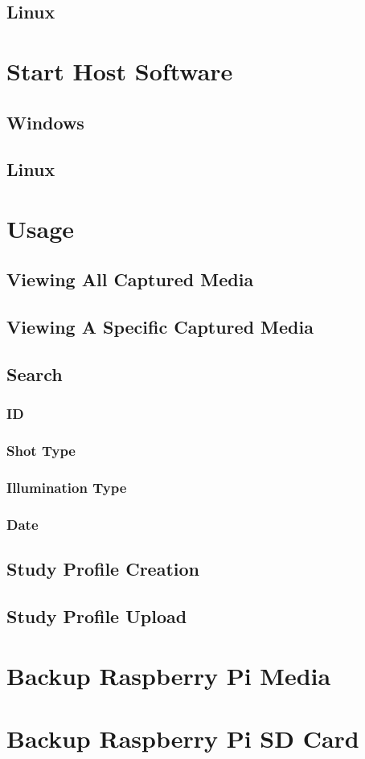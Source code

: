 \documentclass[12pt]{article}
\begin{document}
\begin{landscape}
\begin{center}
\subsection{Linux}
\section{Start Host Software}
\subsection{Windows}
\subsection{Linux}
\section{Usage}
\subsection{Viewing All Captured Media}
\subsection{Viewing A Specific Captured Media}
\subsection{Search}
\subsubsection{ID}
\subsubsection{Shot Type}
\subsubsection{Illumination Type}
\subsubsection{Date}
\subsection{Study Profile Creation}
\subsection{Study Profile Upload}
\section{Backup Raspberry Pi Media}
\section{Backup Raspberry Pi SD Card}
\end{center}
\end{landscape}
\end{document}
